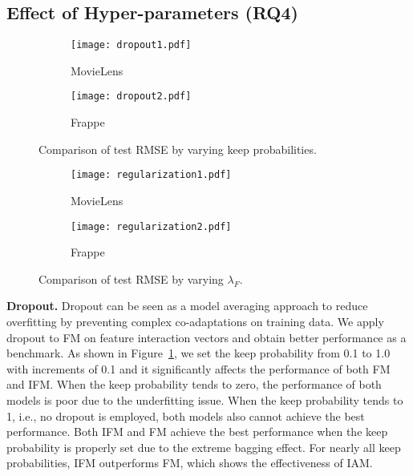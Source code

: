 \documentclass[letterpaper]{article} \usepackage{aaai19}  \usepackage{times}  \usepackage{helvet}  \usepackage{courier}  \usepackage{url}  \usepackage{graphicx}  \frenchspacing  \setlength{\pdfpagewidth}{8.5in}  \setlength{\pdfpageheight}{11in}  \usepackage{mathtools}
\begin{document}
\subsection{Effect of Hyper-parameters (\textbf{RQ4})}

\begin{figure}[t!]
\begin{center} 
\begin{subfigure}[MovieLens]{0.47\columnwidth}
{
\texttt{[image: dropout1.pdf]}
\caption{MovieLens}
} 
\end{subfigure}
\begin{subfigure}[Frappe]{0.47\columnwidth}
{
\texttt{[image: dropout2.pdf]}
\caption{Frappe}
} 
\end{subfigure}
\caption{ Comparison of test RMSE by varying keep probabilities.} 
\label{fig:dropout}  
\end{center}
\end{figure} 


\begin{figure}[t!]
\begin{center} 
\begin{subfigure}[MovieLens]{0.47\columnwidth}
{
\texttt{[image: regularization1.pdf]}
\caption{MovieLens}
} 
\end{subfigure} 
\begin{subfigure}[Frappe]{0.47\columnwidth}
{
\texttt{[image: regularization2.pdf]}
\caption{Frappe}
}
\end{subfigure} 
\caption{ Comparison of test RMSE by varying $\lambda_F$.}
\label{fig:regularization} 
\end{center}
\end{figure} 

\textbf{Dropout.} Dropout can be seen as a model averaging approach to reduce overfitting by preventing complex co-adaptations on training data. We apply dropout to FM on feature interaction vectors and obtain better performance as a benchmark. As shown in Figure~\ref{fig:dropout}, we set the keep probability from 0.1 to 1.0 with increments of 0.1 and it significantly affects the performance of both FM and IFM. When the keep probability tends to zero, the performance of both models is poor due to the underfitting issue. When the keep probability tends to 1, i.e., no dropout is employed, both models also cannot achieve the best performance. Both IFM and FM achieve the best performance when the keep probability is properly set due to the extreme bagging effect. For nearly all keep probabilities, IFM outperforms FM, which shows the effectiveness of IAM.
\end{document}
